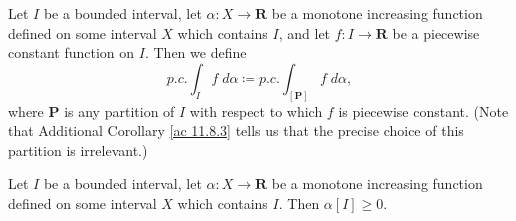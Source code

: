\begin{additional corollary}\label{ac 11.8.4}
Let \(I\) be a bounded interval, let \(\alpha : X \to \mathbf{R}\) be a monotone increasing function defined on some interval \(X\) which contains \(I\), and let \(f : I \to \mathbf{R}\) be a piecewise constant function on \(I\).
Then we define
\[
    p.c. \int_I f \; d \alpha \coloneqq p.c. \int_{[\mathbf{P}]} f \; d \alpha,
\]
where \(\mathbf{P}\) is any partition of \(I\) with respect to which \(f\) is piecewise constant.
(Note that Additional Corollary \ref{ac 11.8.3} tells us that the precise choice of this partition is irrelevant.)
\end{additional corollary}

\begin{additional corollary}\label{ac 11.8.5}
Let \(I\) be a bounded interval, let \(\alpha : X \to \mathbf{R}\) be a monotone increasing function defined on some interval \(X\) which contains \(I\).
Then \(\alpha[I] \geq 0\).
\end{additional corollary}

